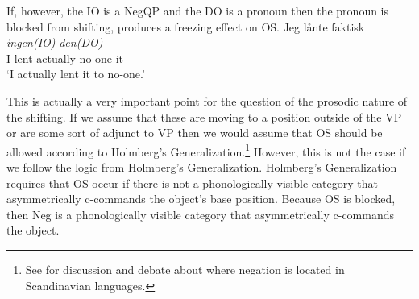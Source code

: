 \documentclass[12pt, letterpaper]{article}
\begin{document}
If, however, the IO is a NegQP and the DO is a pronoun then the pronoun is blocked from shifting, produces a freezing effect on OS.
	\ea 
	\gll Jeg lånte faktisk \textit{ingen(IO)} \textit{den(DO)}\\
	I lent actually no-one it\\
	\glt `I actually lent it to no-one.'
	\z

This is actually a very important point for the question of the prosodic nature of the shifting. If we assume that these are moving to a position outside of the VP or are some sort of adjunct to VP then we would assume that OS should be allowed according to Holmberg's Generalization.\footnote{See \citet{thrainssonSyntaxIcelandic2010} for discussion and debate about where negation is located in Scandinavian languages.} However, this is not the case if we follow the logic from Holmberg's Generalization. Holmberg's Generalization requires that OS occur if there is not a phonologically visible category that asymmetrically c-commands the object's base position. Because OS is blocked, then Neg is a phonologically visible category that asymmetrically c-commands the object. 
\end{document}
